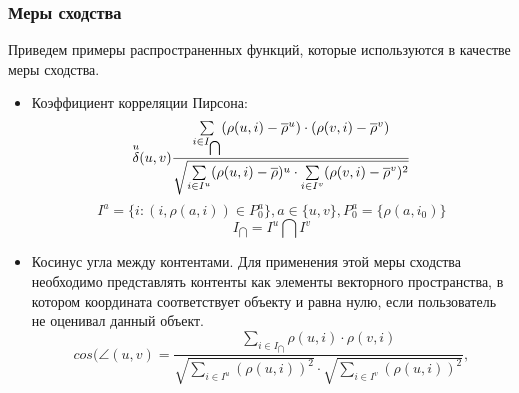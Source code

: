 \subsubsection{Меры сходства}
Приведем примеры распространенных функций, которые используются в качестве меры
сходства.
\begin{itemize}
\item Коэффициент корреляции Пирсона\label{pearson}:
\begin{equation}
	{\overset{u}{\mathcal{\delta}}}(u,v)\frac{\sum \limits_{i \in I_{\bigcap}}(\rho(u,i) - \overline{\rho}^u) \cdot
	(\rho(v,i) - \overline{\rho}^v)}
                {\sqrt{\sum \limits_{i \in I^u}(\rho(u,i) - \overline{\rho})^u \cdot
                    \sum \limits_{i \in I^v}(\rho(v,i) - \overline{\rho}^v)^2}}
\end{equation}
\begin{equation*}
	I^a = \{i: (i, \rho(a,i)) \in P^a_0\}, a \in \{u,v\},P^a_0 = \{\rho(a, i_0)\}
\end{equation*}
\begin{equation*}
	I_{\bigcap} = I^u \bigcap I^v
\end{equation*}
\item Косинус угла между контентами.
	Для применения этой меры сходства необходимо представлять
контенты как элементы векторного пространства, в котором координата
		соответствует объекту и равна нулю, если пользователь не оценивал
		данный объект.
\begin{equation}
cos(\angle(u,v) = \frac{\sum \limits_{ i \in I_{\bigcap} } \rho(u,i) \cdot \rho(v,i)}{
\sqrt{ \sum \limits_{i \in  I^u } (\rho(u,i))^2 } \cdot \sqrt{ \sum \limits_{ i \in I^v} (\rho(u,i))^2 }},
\end{equation}
\end{itemize}
